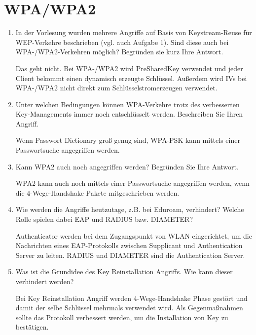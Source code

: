 \documentclass[12pt,a4paper]{article}
\newenvironment{exercise}
	{\begin{enumerate}[label=\bfseries\alph*).]\bfseries}
{\end{enumerate}}
\newenvironment{answer}{\par\normalfont}{}
\begin{document}
    \section{WPA/WPA2}
    	\begin{exercise}
    		\item In der Vorlesung wurden mehrere Angriffe auf Basis von Keystream-Reuse für WEP-Verkehre beschrieben (vgl. auch Aufgabe 1). Sind diese auch bei WPA-/WPA2-Verkehren möglich? Begründen sie kurz Ihre Antwort.
    			\begin{answer}
    				Das geht nicht. Bei WPA-/WPA2 wird PreSharedKey verwendet und jeder Client bekommt einen dynamisch erzeugte Schlüssel. Außerdem wird IVs bei WPA-/WPA2 nicht direkt zum Schlüsselstromerzeugen verwendet.
    			\end{answer}
    		\item Unter welchen Bedingungen können WPA-Verkehre trotz des verbesserten Key-Managements immer noch entschlüsselt werden. Beschreiben Sie Ihren Angriff.
    		\begin{answer}
    			Wenn Passwort Dictionary groß genug sind, WPA-PSK kann mittels einer Passwortsuche angegriffen werden.
    		\end{answer}
    		\item Kann WPA2 auch noch angegriffen werden? Begründen Sie Ihre Antwort.
    		\begin{answer}
    			WPA2 kann auch noch mittels einer Passwortsuche angegriffen werden, wenn die 4-Wege-Handshake Pakete mitgeschrieben werden.
    		\end{answer}
    		\item Wie werden die Angriffe heutzutage, z.B. bei Eduroam, verhindert? Welche Rolle spielen dabei EAP und RADIUS bzw. DIAMETER?
    		\begin{answer}
    			Authenticator werden bei dem Zugangspunkt von WLAN eingerichtet, um die Nachrichten eines EAP-Protokolls zwischen Supplicant und Authentication Server zu leiten.
    			RADIUS und DIAMETER sind die Authentication Server.
    		\end{answer}
    		\item Was ist die Grundidee des Key Reinstallation Angriffs. Wie kann dieser verhindert werden?
    		\begin{answer}
    		Bei Key Reinstallation Angriff werden 4-Wege-Handshake Phase gestört und damit der selbe Schlüssel mehrmals verwendet wird.
    		Als Gegenmaßnahmen sollte das Protokoll verbessert werden, um die Installation von Key zu bestätigen. 
    		\end{answer}
    		
    	\end{exercise}
\end{document}
